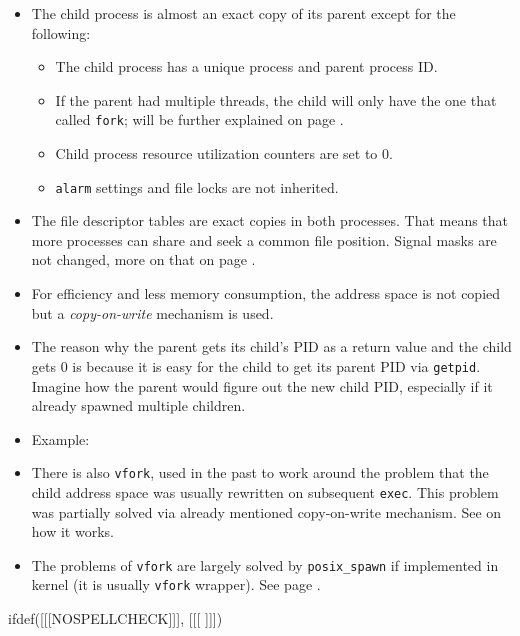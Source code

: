\begin{itemize}
\item {} The child process is almost an exact copy of its parent
except for the following:
\begin{itemize}
\item The child process has a unique process and parent process ID.
\item If the parent had multiple threads, the child will only have the one that
called \texttt{fork}; will be further explained on page \pageref{FORKALL}.
\item Child process resource utilization counters are set to 0.
\item \texttt{alarm} settings and file locks are not inherited.
\end{itemize}
\item The file descriptor tables are exact copies in both processes.  That means
that more processes can share and seek a common file position.  Signal masks are
not changed, more on that on page \pageref{SIGNALBLOCKINGEXAMPLE}.
\item For efficiency and less memory consumption, the address space is not copied
but a \emph{copy-on-write} mechanism is used.
\item The reason why the parent gets its child's PID as a return value and the
child gets 0 is because it is easy for the child to get its parent PID via
\texttt{getpid}.  Imagine how the parent would figure out the new child PID,
especially if it already spawned multiple children.
\item Example: 
\item {} There is also \texttt{vfork}, used in the past to work
around the problem that the child address space was usually rewritten on
subsequent \texttt{exec}.  This problem was partially solved via already
mentioned copy-on-write mechanism.  See  on how it works.
\item The problems of \texttt{vfork} are largely solved by
\texttt{posix\_spawn} if implemented in kernel (it is usually
\texttt{vfork} wrapper). See page \pageref{SPAWN}.
\end{itemize}


ifdef([[[NOSPELLCHECK]]], [[[
]]])

